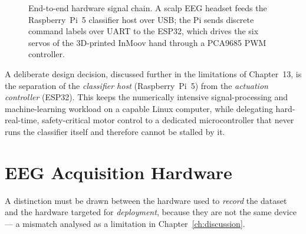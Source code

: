 \begin{figure}[htbp]
\centering
{}
\caption{End-to-end hardware signal chain. A scalp EEG headset feeds
the Raspberry~Pi~5 classifier host over USB; the Pi sends discrete
command labels over UART to the ESP32, which drives the six servos of
the 3D-printed InMoov hand through a PCA9685 PWM controller.}
\label{fig:hw_chain}
\end{figure}

A deliberate design decision, discussed further in the limitations of
Chapter~13, is the separation of the \emph{classifier host}
(Raspberry~Pi~5) from the \emph{actuation controller} (ESP32). This
keeps the numerically intensive signal-processing and machine-learning
workload on a capable Linux computer, while delegating hard-real-time,
safety-critical motor control to a dedicated microcontroller that
never runs the classifier itself and therefore cannot be stalled by
it.

\section{EEG Acquisition Hardware}
\label{sec:hw_acquisition}

A distinction must be drawn between the hardware used to \emph{record}
the dataset and the hardware targeted for \emph{deployment}, because
they are not the same device --- a mismatch analysed as a limitation
in Chapter~\ref{ch:discussion}.

